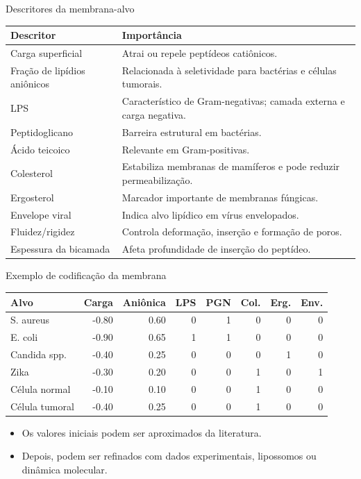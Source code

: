 \documentclass[aspectratio=169,10pt]{beamer}
\begin{document}
\begin{frame}{Descritores da membrana-alvo}
\small
\begin{center}
\begin{tabular}{p{3.7cm}p{8.2cm}}
\toprule
\textbf{Descritor} & \textbf{Importância} \\
\midrule
Carga superficial & Atrai ou repele peptídeos catiônicos. \\
Fração de lipídios aniônicos & Relacionada à seletividade para bactérias e células tumorais. \\
LPS & Característico de Gram-negativas; camada externa e carga negativa. \\
Peptidoglicano & Barreira estrutural em bactérias. \\
Ácido teicoico & Relevante em Gram-positivas. \\
Colesterol & Estabiliza membranas de mamíferos e pode reduzir permeabilização. \\
Ergosterol & Marcador importante de membranas fúngicas. \\
Envelope viral & Indica alvo lipídico em vírus envelopados. \\
Fluidez/rigidez & Controla deformação, inserção e formação de poros. \\
Espessura da bicamada & Afeta profundidade de inserção do peptídeo. \\
\bottomrule
\end{tabular}
\end{center}
\end{frame}

\begin{frame}{Exemplo de codificação da membrana}
\small
\begin{center}
\begin{tabular}{p{2.4cm}rrrrrrr}
\toprule
\textbf{Alvo} & \textbf{Carga} & \textbf{Aniônica} & \textbf{LPS} & \textbf{PGN} & \textbf{Col.} & \textbf{Erg.} & \textbf{Env.} \\
\midrule
S. aureus & -0.80 & 0.60 & 0 & 1 & 0 & 0 & 0 \\
E. coli & -0.90 & 0.65 & 1 & 1 & 0 & 0 & 0 \\
Candida spp. & -0.40 & 0.25 & 0 & 0 & 0 & 1 & 0 \\
Zika & -0.30 & 0.20 & 0 & 0 & 1 & 0 & 1 \\
Célula normal & -0.10 & 0.10 & 0 & 0 & 1 & 0 & 0 \\
Célula tumoral & -0.40 & 0.25 & 0 & 0 & 1 & 0 & 0 \\
\bottomrule
\end{tabular}
\end{center}

\vspace{0.15cm}
\begin{itemize}
  \item Os valores iniciais podem ser aproximados da literatura.
  \item Depois, podem ser refinados com dados experimentais, lipossomos ou dinâmica molecular.
\end{itemize}
\end{frame}
\end{document}
